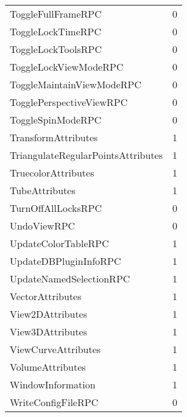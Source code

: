 \documentclass[10pt,a4paper]{report}
\begin{document}
\begin{longtable}{ll}
ToggleFullFrameRPC & 0 \\
ToggleLockTimeRPC & 0 \\
ToggleLockToolsRPC & 0 \\
ToggleLockViewModeRPC & 0 \\
ToggleMaintainViewModeRPC & 0 \\
TogglePerspectiveViewRPC & 0 \\
ToggleSpinModeRPC & 0 \\
TransformAttributes & 1 \\
TriangulateRegularPointsAttributes & 1 \\
TruecolorAttributes & 1 \\
TubeAttributes & 1 \\
TurnOffAllLocksRPC & 0 \\
UndoViewRPC & 0 \\
UpdateColorTableRPC & 1 \\
UpdateDBPluginInfoRPC & 1 \\
UpdateNamedSelectionRPC & 1 \\
VectorAttributes & 1 \\
View2DAttributes & 1 \\
View3DAttributes & 1 \\
ViewCurveAttributes & 1 \\
VolumeAttributes & 1 \\
WindowInformation & 1 \\
WriteConfigFileRPC & 0 \\
\end{longtable}

\end{document}

